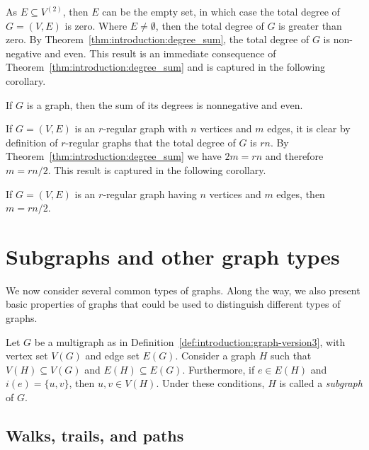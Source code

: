 As $E \subseteq V^{(2)}$, then $E$ can be the empty set, in which
case the total degree of $G = (V, E)$ is zero. Where $E \neq
\emptyset$, then the total degree of $G$ is greater than zero. By
Theorem~\ref{thm:introduction:degree_sum}, the total degree of $G$ is
non-negative and even. This result is an immediate consequence of
Theorem~\ref{thm:introduction:degree_sum} and is captured in the
following corollary.

\begin{corollary}
\label{cor:introduction:degree_sum_even}
If $G$ is a graph, then the sum of its degrees is nonnegative
and even.
\end{corollary}

If $G = (V, E)$ is an $r$-regular graph with $n$ vertices and $m$
edges, it is clear by definition of $r$-regular graphs that the total
degree of $G$ is $rn$. By Theorem~\ref{thm:introduction:degree_sum} we
have $2m = rn$ and therefore $m = rn / 2$. This result is captured in
the following corollary.

\begin{corollary}
If $G = (V, E)$ is an $r$-regular graph having $n$ vertices and $m$
edges, then $m = rn / 2$.
\end{corollary}



\section{Subgraphs and other graph types}
\label{sec:introduction:subgraphs_graph_types}

We now consider several common types of graphs. Along the way, we also
present basic properties of graphs that could be used to distinguish
different types of graphs.

Let $G$ be a multigraph as in
Definition~\ref{def:introduction:graph-version3}, with vertex set
$V(G)$ and edge set $E(G)$. Consider a graph $H$ such that
$V(H) \subseteq V(G)$ and $E(H) \subseteq E(G)$. Furthermore, if
$e \in E(H)$ and $i(e) = \{u,v\}$, then $u,v \in V(H)$. Under these
conditions, $H$ is called a \emph{subgraph} of $G$.



\subsection{Walks, trails, and paths}
\label{subsec:introduction:walks_trails_paths}

